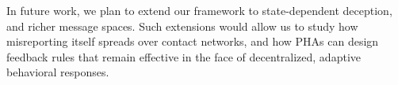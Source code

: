 \documentclass[sigconf,review]{acmart}
\begin{document}

In future work, we plan to extend our framework to state-dependent deception, and richer message spaces. %
Such extensions would allow us to study how misreporting itself spreads over contact networks, and how PHAs can design feedback rules that remain effective in the face of decentralized, adaptive behavioral responses.





\end{document}
